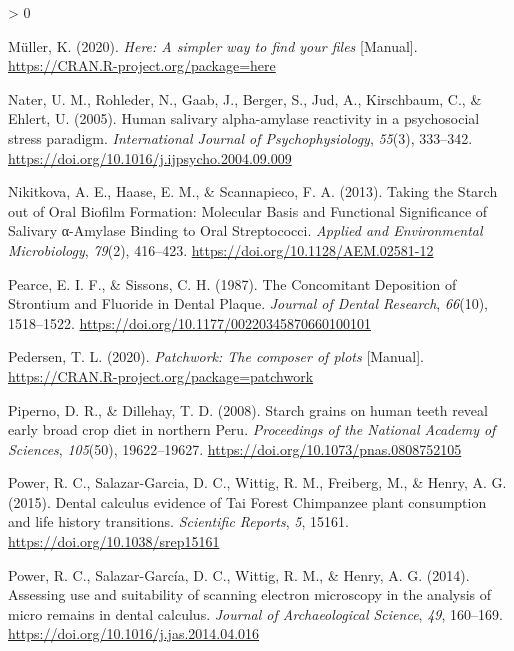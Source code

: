 \documentclass[
]{article}
\newlength{\cslhangindent}
\newenvironment{CSLReferences}[2] %
 {%
  \setlength{\parindent}{0pt}
  \ifodd #1 \everypar{\setlength{\hangindent}{\cslhangindent}}\ignorespaces\fi
  \ifnum #2 > 0
  \setlength{\parskip}{#2\baselineskip}
  \fi
 }%
 {}
\begin{document}
\begin{CSLReferences}{1}{0}
\leavevmode\hypertarget{ref-R-here}{}%
Müller, K. (2020). \emph{Here: A simpler way to find your files} {[}Manual{]}. \url{https://CRAN.R-project.org/package=here}

\leavevmode\hypertarget{ref-naterHumanAmylase2005}{}%
Nater, U. M., Rohleder, N., Gaab, J., Berger, S., Jud, A., Kirschbaum, C., \& Ehlert, U. (2005). Human salivary alpha-amylase reactivity in a psychosocial stress paradigm. \emph{International Journal of Psychophysiology}, \emph{55}(3), 333--342. \url{https://doi.org/10.1016/j.ijpsycho.2004.09.009}

\leavevmode\hypertarget{ref-nikitkovaStarchBiofilms2013}{}%
Nikitkova, A. E., Haase, E. M., \& Scannapieco, F. A. (2013). Taking the {Starch} out of {Oral Biofilm Formation}: Molecular {Basis} and {Functional Significance} of {Salivary} α-{Amylase Binding} to {Oral Streptococci}. \emph{Applied and Environmental Microbiology}, \emph{79}(2), 416--423. \url{https://doi.org/10.1128/AEM.02581-12}

\leavevmode\hypertarget{ref-pearceConcomitantDepositionStrontium1987}{}%
Pearce, E. I. F., \& Sissons, C. H. (1987). The {Concomitant Deposition} of {Strontium} and {Fluoride} in {Dental Plaque}. \emph{Journal of Dental Research}, \emph{66}(10), 1518--1522. \url{https://doi.org/10.1177/00220345870660100101}

\leavevmode\hypertarget{ref-R-patchwork}{}%
Pedersen, T. L. (2020). \emph{Patchwork: The composer of plots} {[}Manual{]}. \url{https://CRAN.R-project.org/package=patchwork}

\leavevmode\hypertarget{ref-pipernoStarchGrains2008}{}%
Piperno, D. R., \& Dillehay, T. D. (2008). Starch grains on human teeth reveal early broad crop diet in northern {Peru}. \emph{Proceedings of the National Academy of Sciences}, \emph{105}(50), 19622--19627. \url{https://doi.org/10.1073/pnas.0808752105}

\leavevmode\hypertarget{ref-powerChimpCalculus2015}{}%
Power, R. C., Salazar-Garcia, D. C., Wittig, R. M., Freiberg, M., \& Henry, A. G. (2015). Dental calculus evidence of {Tai Forest Chimpanzee} plant consumption and life history transitions. \emph{Scientific Reports}, \emph{5}, 15161. \url{https://doi.org/10.1038/srep15161}

\leavevmode\hypertarget{ref-powerSEMCalculus2014}{}%
Power, R. C., Salazar-García, D. C., Wittig, R. M., \& Henry, A. G. (2014). Assessing use and suitability of scanning electron microscopy in the analysis of micro remains in dental calculus. \emph{Journal of Archaeological Science}, \emph{49}, 160--169. \url{https://doi.org/10.1016/j.jas.2014.04.016}


\end{CSLReferences}
\end{document}
